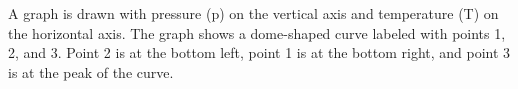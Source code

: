 A graph is drawn with pressure (p) on the vertical axis and temperature (T) on the horizontal axis. The graph shows a dome-shaped curve labeled with points 1, 2, and 3. Point 2 is at the bottom left, point 1 is at the bottom right, and point 3 is at the peak of the curve.